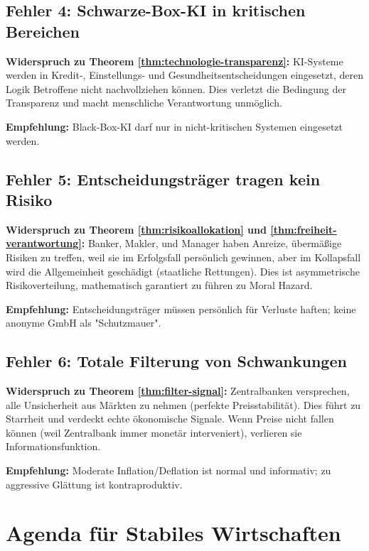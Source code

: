 \documentclass[a4paper, 12pt, twoside, openright]{report}
\theoremstyle{definition}
\theoremstyle{definition}
\begin{document}
\subsection{Fehler 4: Schwarze-Box-KI in kritischen Bereichen}

\textbf{Widerspruch zu Theorem \ref{thm:technologie-transparenz}:}
KI-Systeme werden in Kredit-, Einstellungs- und Gesundheitsentscheidungen eingesetzt, deren Logik Betroffene nicht nachvollziehen können. Dies verletzt die Bedingung der Transparenz und macht menschliche Verantwortung unmöglich.

\textbf{Empfehlung:} Black-Box-KI darf nur in nicht-kritischen Systemen eingesetzt werden.

\subsection{Fehler 5: Entscheidungsträger tragen kein Risiko}

\textbf{Widerspruch zu Theorem \ref{thm:risikoallokation} und \ref{thm:freiheit-verantwortung}:}
Banker, Makler, und Manager haben Anreize, übermäßige Risiken zu treffen, weil sie im Erfolgsfall persönlich gewinnen, aber im Kollapsfall wird die Allgemeinheit geschädigt (staatliche Rettungen). Dies ist asymmetrische Risikoverteilung, mathematisch garantiert zu führen zu Moral Hazard.

\textbf{Empfehlung:} Entscheidungsträger müssen persönlich für Verluste haften; keine anonyme GmbH als "Schutzmauer".

\subsection{Fehler 6: Totale Filterung von Schwankungen}

\textbf{Widerspruch zu Theorem \ref{thm:filter-signal}:}
Zentralbanken versprechen, alle Unsicherheit aus Märkten zu nehmen (perfekte Preisstabilität). Dies führt zu Starrheit und verdeckt echte ökonomische Signale. Wenn Preise nicht fallen können (weil Zentralbank immer monetär interveniert), verlieren sie Informationsfunktion.

\textbf{Empfehlung:} Moderate Inflation/Deflation ist normal und informativ; zu aggressive Glättung ist kontraproduktiv.

\section{Agenda für Stabiles Wirtschaften}
\end{document}
